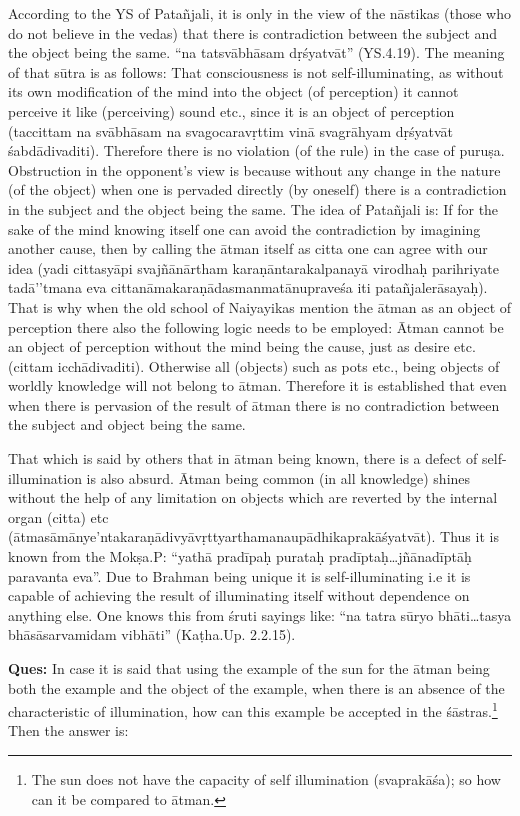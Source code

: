 According to the YS of Patañjali, it is only in the view of the nāstikas (those who do not believe in the vedas) that there is contradiction between the subject and the object being the same.  “na tatsvābhāsam dṛśyatvāt” (YS.4.19). The meaning of that sūtra is as follows: That consciousness is not self-illuminating, as without its own modification of the mind into the object (of perception) it cannot perceive it like (perceiving) sound etc., since it is an object of perception (taccittam na svābhāsam na svagocaravṛttim vinā svagrāhyam dṛśyatvāt śabdādivaditi). Therefore there is no violation (of the rule) in the case of puruṣa.   Obstruction in the opponent’s view is because without any change in the nature (of the object) when one is pervaded directly (by oneself) there is a contradiction in the subject and the object being the same. The idea of Patañjali is:  If for the sake of the mind knowing itself one can avoid the contradiction by imagining another cause, then by calling the ātman itself as citta one can agree with our idea (yadi cittasyāpi svajñānārtham karaṇāntarakalpanayā virodhaḥ parihriyate tadā’’tmana eva cittanāmakaraṇādasmanmatānupraveśa iti patañjalerāsayaḥ). That is why when the old school of Naiyayikas mention the ātman as an object of perception there also the following logic needs to be employed: Ātman cannot be an object of perception without the mind being the cause, just as desire etc. (cittam icchādivaditi).  Otherwise all (objects) such as pots etc., being objects of worldly knowledge will not belong to ātman. Therefore it is established that even when there is pervasion of the result of ātman there is no contradiction between the subject and object being the same.

That which is said by others that in ātman being known, there is a defect of self-illumination is also absurd. Ātman being common (in all knowledge) shines without the help of any limitation on objects which are reverted by the internal organ (citta) etc (ātmasāmānye’ntakaraṇā\-divyāvṛttyarthamanaupādhikaprakāśyatvāt). Thus it is known from the Mokṣa.P: “yathā pradīpaḥ purataḥ pradīptaḥ…jñānadīptāḥ paravanta eva”. Due to Brahman being unique it is self-illuminating i.e it is capable of achieving the result of illuminating itself without dependence on anything else. One knows this from śruti sayings like: “na tatra sūryo bhāti…tasya bhāsāsarvamidam vibhāti” (Kaṭha.Up. 2.2.15). 

\textbf{Ques:} In case it is said that using the example of the sun for the ātman being both the   example and the object of the  example, when there is an absence of the characteristic of illumination, how can this example be accepted in the śāstras.\footnote{The sun does not have the capacity of self illumination (svaprakāśa); so how can it be compared to ātman.} Then the answer is: 

